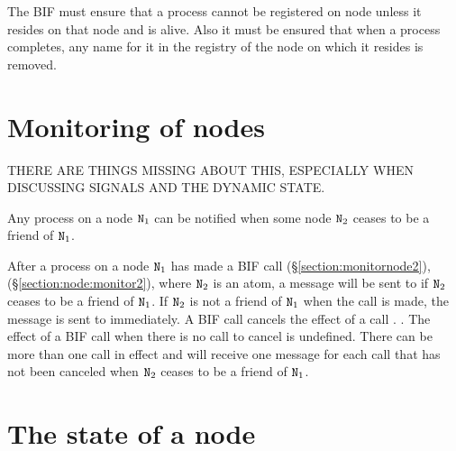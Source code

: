 The BIF  must ensure that
a process cannot be registered on node  unless it resides on
that node and is alive.  Also it must be ensured that when a process
completes, any name for it in the registry of the node on which it resides
is removed.

\section{Monitoring of nodes}

\label{section:monitor-node}
\ifOld {} \fi
\ifStd {} \fi

THERE ARE THINGS MISSING ABOUT THIS, ESPECIALLY WHEN DISCUSSING SIGNALS AND
THE DYNAMIC STATE.

Any process on a node ${\tt{\sl N}}_1$ can be notified when some node ${\tt{\sl N}}_2$ ceases to
be a friend of ${\tt{\sl N}}_1$.

After a process  on a node ${\tt{\sl N}}_1$ has made a BIF call
\ifOld {} (\S\ref{section:monitornode2}),\fi
\ifStd {} (\S\ref{section:node:monitor2}),\fi
where ${\tt{\sl N}}_2$ is an atom, a message  will be sent to 
if ${\tt{\sl N}}_2$ ceases to be a friend of ${\tt{\sl N}}_1$.  If ${\tt{\sl N}}_2$ is not a friend of ${\tt{\sl N}}_1$
when the call is made, the message  is sent to  immediately.
A BIF call
\ifOld {} \fi
\ifStd {} \fi
cancels the effect of a call
\ifOld {}. \fi
\ifStd {}. \fi
The effect of a BIF call
\ifOld {} \fi
\ifStd {} \fi
when there is no call
\ifOld {} \fi
\ifStd {} \fi
to cancel is undefined.  There can be
more than one call
\ifOld {} \fi
\ifStd {} \fi
in effect and  will receive one message
for each call
\ifOld {} \fi
\ifStd {} \fi
that has not been canceled when ${\tt{\sl N}}_2$ ceases
to be a friend of  ${\tt{\sl N}}_1$.
\ifOld {} \fi
\ifStd {} \fi
{}

\section{The state of a node}

